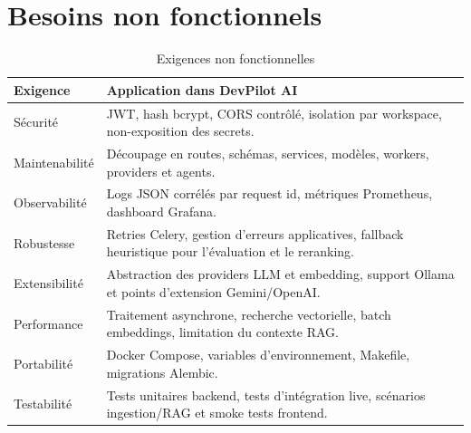 \documentclass[12pt,a4paper,oneside]{report}
\begin{document}
\section{Besoins non fonctionnels}
\begin{table}[H]
  \centering
  \caption{Exigences non fonctionnelles}
  \begin{tabularx}{\textwidth}{L{3.2cm}Y}
    \toprule
    \textbf{Exigence} & \textbf{Application dans DevPilot AI} \\
    \midrule
    Sécurité & JWT, hash bcrypt, CORS contrôlé, isolation par workspace, non-exposition des secrets. \\
    Maintenabilité & Découpage en routes, schémas, services, modèles, workers, providers et agents. \\
    Observabilité & Logs JSON corrélés par request id, métriques Prometheus, dashboard Grafana. \\
    Robustesse & Retries Celery, gestion d'erreurs applicatives, fallback heuristique pour l'évaluation et le reranking. \\
    Extensibilité & Abstraction des providers LLM et embedding, support Ollama et points d'extension Gemini/OpenAI. \\
    Performance & Traitement asynchrone, recherche vectorielle, batch embeddings, limitation du contexte RAG. \\
    Portabilité & Docker Compose, variables d'environnement, Makefile, migrations Alembic. \\
    Testabilité & Tests unitaires backend, tests d'intégration live, scénarios ingestion/RAG et smoke tests frontend. \\
    \bottomrule
  \end{tabularx}
\end{table}
\end{document}
